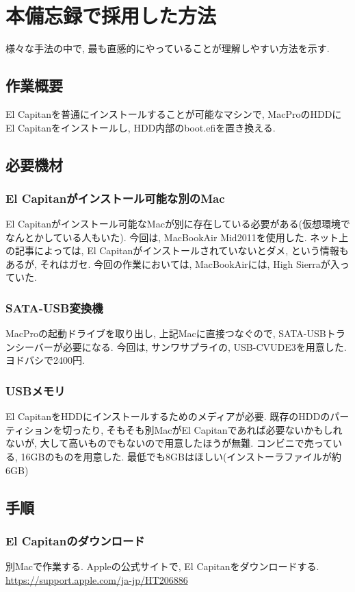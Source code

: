 \documentclass{jsarticle}
\begin{document}
\section{本備忘録で採用した方法}
様々な手法の中で, 最も直感的にやっていることが理解しやすい方法を示す. 

\subsection{作業概要}
El Capitanを普通にインストールすることが可能なマシンで, MacProのHDDにEl Capitanをインストールし, HDD内部のboot.efiを置き換える. 

\subsection{必要機材}
\subsubsection{El Capitanがインストール可能な別のMac}
El Capitanがインストール可能なMacが別に存在している必要がある(仮想環境でなんとかしている人もいた). 
今回は, MacBookAir Mid2011を使用した. 
ネット上の記事によっては, El Capitanがインストールされていないとダメ, という情報もあるが, それはガセ. 
今回の作業においては, MacBookAirには, High Sierraが入っていた. 

\subsubsection{SATA-USB変換機}
MacProの起動ドライブを取り出し, 上記Macに直接つなぐので, SATA-USBトランシーバーが必要になる. 
今回は, サンワサプライの, USB-CVUDE3を用意した. ヨドバシで2400円. 

\subsubsection{USBメモリ}
El CapitanをHDDにインストールするためのメディアが必要. 
既存のHDDのパーティションを切ったり, そもそも別MacがEl Capitanであれば必要ないかもしれないが, 大して高いものでもないので用意したほうが無難. 
コンビニで売っている, 16GBのものを用意した. 
最低でも8GBはほしい(インストーラファイルが約6GB)

\subsection{手順}
\subsubsection{El Capitanのダウンロード}\label{sequence_download}
別Macで作業する. 
Appleの公式サイトで, El Capitanをダウンロードする. 
\url{https://support.apple.com/ja-jp/HT206886}
\end{document}
